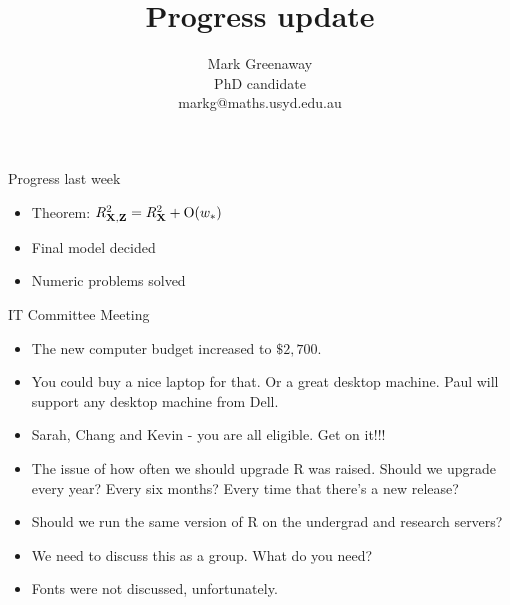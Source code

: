 \documentclass{beamer}
\title{Progress update}
\author{Mark Greenaway\\PhD candidate\\markg@maths.usyd.edu.au}
\begin{document}
\begin{frame}
\titlepage
\end{frame}


\begin{frame}{Progress last week}
\begin{itemize}
\def \O { \text{O} }
\item Theorem: $R^2_{\mX, \mZ} = R^2_\mX + \O(w_*)$
\item Final model decided
\item Numeric problems solved
\end{itemize}
\end{frame}


\begin{frame}{IT Committee Meeting}
\begin{itemize}
\item The new computer budget increased to $\$2,700$.
\item You could buy a nice laptop for that. Or a great desktop machine. Paul will support any desktop
			machine from Dell.
\item Sarah, Chang and Kevin - you are all eligible. Get on it!!!
\item The issue of how often we should upgrade R was raised. Should we upgrade every year? Every six months?
			Every time that there's a new release?
\item Should we run the same version of R on the undergrad and research servers?
\item We need to discuss this as a group. What do you need?
\item Fonts were not discussed, unfortunately.
\end{itemize}
\end{frame}


\end{document}
